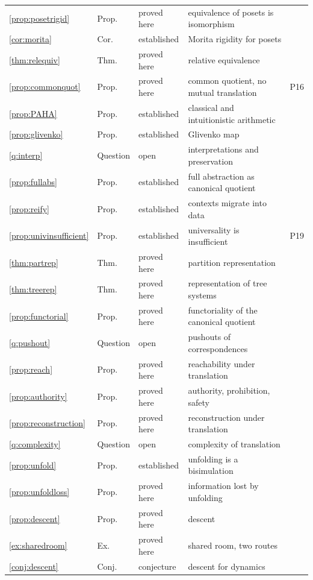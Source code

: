 \begin{center}
\begin{longtable}{lllp{5.3cm}l}
\ref{prop:posetrigid} & Prop. & proved here & equivalence of posets is isomorphism & \\
\ref{cor:morita} & Cor. & established & Morita rigidity for posets & \\
\ref{thm:relequiv} & Thm. & proved here & relative equivalence & \\
\ref{prop:commonquot} & Prop. & proved here & common quotient, no mutual translation & P16\\
\ref{prop:PAHA} & Prop. & established & classical and intuitionistic arithmetic & \\
\ref{prop:glivenko} & Prop. & established & Glivenko map & \\
\ref{q:interp} & Question & open & interpretations and preservation & \\
\ref{prop:fullabs} & Prop. & established & full abstraction as canonical quotient & \\
\ref{prop:reify} & Prop. & established & contexts migrate into data & \\
\ref{prop:univinsufficient} & Prop. & established & universality is insufficient & P19\\
\ref{thm:partrep} & Thm. & proved here & partition representation & \\
\ref{thm:treerep} & Thm. & proved here & representation of tree systems & \\
\ref{prop:functorial} & Prop. & proved here & functoriality of the canonical quotient & \\
\ref{q:pushout} & Question & open & pushouts of correspondences & \\
\ref{prop:reach} & Prop. & proved here & reachability under translation & \\
\ref{prop:authority} & Prop. & proved here & authority, prohibition, safety & \\
\ref{prop:reconstruction} & Prop. & proved here & reconstruction under translation & \\
\ref{q:complexity} & Question & open & complexity of translation & \\
\ref{prop:unfold} & Prop. & established & unfolding is a bisimulation & \\
\ref{prop:unfoldloss} & Prop. & proved here & information lost by unfolding & \\
\ref{prop:descent} & Prop. & proved here & descent & \\
\ref{ex:sharedroom} & Ex. & proved here & shared room, two routes & \\
\ref{conj:descent} & Conj. & conjecture & descent for dynamics & \\
\bottomrule
\end{longtable}
\end{center}


